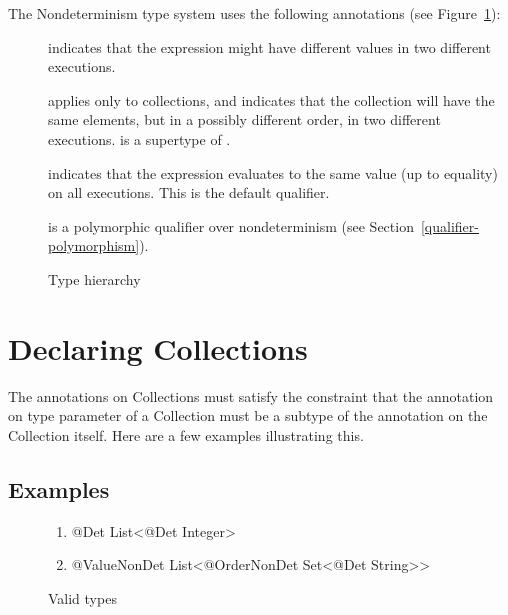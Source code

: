 The Nondeterminism type system uses the following annotations (see Figure~\ref{fig-hierarchy}):
\begin{description}
\item[] indicates
  that the expression might have different values in two different executions.
\item[] applies only
  to collections, and indicates that the collection will have the same
  elements, but in a possibly different order, in two different executions.
   is a supertype of .
\item[] indicates that
  the expression evaluates to the same value (up to equality) on all executions.
  This is the default qualifier.
\item[] is a
  polymorphic qualifier over nondeterminism (see Section~\ref{qualifier-polymorphism}).
\end{description}

\begin{figure}
  \begin{center}
  \end{center}
\caption{Type hierarchy}
\label{fig-hierarchy}
\end{figure}


\section{Declaring Collections\label{nondeterminism-type-validity}}

The annotations on Collections must satisfy the constraint that the annotation on type parameter of a Collection must be a
subtype of the annotation on the Collection itself. Here are a few examples illustrating this.

\subsection{Examples\label{nondeterminism-validity-examples}}
\begin{figure}[h]\caption{Valid types}
  \begin{enumerate}
    \item @Det List<@Det Integer>
    \item @ValueNonDet List<@OrderNonDet Set<@Det String>>
  \end{enumerate}
\end{figure}

